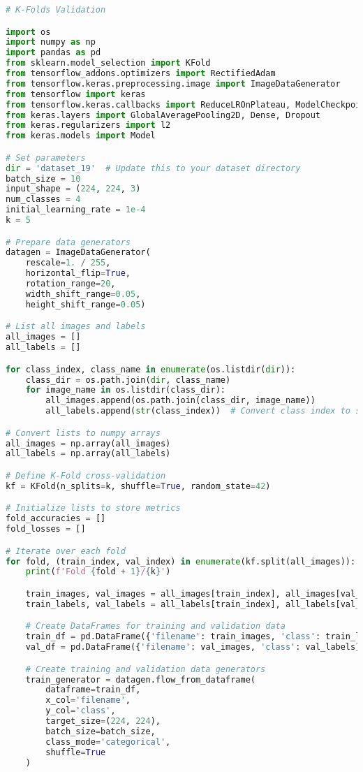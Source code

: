 \begin{lstlisting}[language=Python]
# K-Folds Validation

import os
import numpy as np
import pandas as pd
from sklearn.model_selection import KFold
from tensorflow_addons.optimizers import RectifiedAdam
from tensorflow.keras.preprocessing.image import ImageDataGenerator
from tensorflow import keras
from tensorflow.keras.callbacks import ReduceLROnPlateau, ModelCheckpoint, EarlyStopping
from keras.layers import GlobalAveragePooling2D, Dense, Dropout
from keras.regularizers import l2
from keras.models import Model

# Set parameters
dir = 'dataset_19'  # Update this to your dataset directory
batch_size = 10
input_shape = (224, 224, 3)
num_classes = 4
initial_learning_rate = 1e-4
k = 5

# Prepare data generators
datagen = ImageDataGenerator(
    rescale=1. / 255,
    horizontal_flip=True,
    rotation_range=20,
    width_shift_range=0.05,
    height_shift_range=0.05)

# List all images and labels
all_images = []
all_labels = []

for class_index, class_name in enumerate(os.listdir(dir)):
    class_dir = os.path.join(dir, class_name)
    for image_name in os.listdir(class_dir):
        all_images.append(os.path.join(class_dir, image_name))
        all_labels.append(str(class_index))  # Convert class index to string

# Convert lists to numpy arrays
all_images = np.array(all_images)
all_labels = np.array(all_labels)

# Define K-Fold cross-validation
kf = KFold(n_splits=k, shuffle=True, random_state=42)

# Initialize lists to store metrics
fold_accuracies = []
fold_losses = []

# Iterate over each fold
for fold, (train_index, val_index) in enumerate(kf.split(all_images)):
    print(f'Fold {fold + 1}/{k}')

    train_images, val_images = all_images[train_index], all_images[val_index]
    train_labels, val_labels = all_labels[train_index], all_labels[val_index]

    # Create DataFrames for training and validation data
    train_df = pd.DataFrame({'filename': train_images, 'class': train_labels})
    val_df = pd.DataFrame({'filename': val_images, 'class': val_labels})

    # Create training and validation data generators
    train_generator = datagen.flow_from_dataframe(
        dataframe=train_df,
        x_col='filename',
        y_col='class',
        target_size=(224, 224),
        batch_size=batch_size,
        class_mode='categorical',
        shuffle=True
    )


\end{lstlisting}
